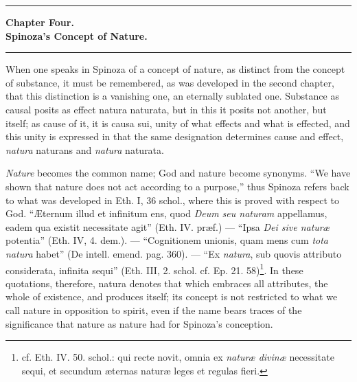 \documentclass[12pt,a4paper,openany]{book}
\newcommand{\opage}[1]{\marginnote{\footnotesize\textit{[#1]}}}
\begin{document}
\bigskip
\begin{center}\rule{2.5cm}{0.4pt}\end{center}
\bigskip

\begin{center}
{\large\textbf{Chapter Four.}}\\[4pt]
\textbf{Spinoza's Concept of Nature.}\\[6pt]
\rule{2cm}{0.4pt}
\end{center}
\bigskip

When one speaks in Spinoza of a concept of nature, as distinct from
the concept of substance, it must be remembered, as was developed in the second chapter,
that this distinction is a vanishing one, an eternally
sublated one. Substance as causal posits as effect natura
naturata, but in this it posits not another, but itself; as
cause of it, it is causa sui, unity of what effects and what is
effected, and this unity is expressed in that the same designation
determines cause and effect, \emph{natura} naturans and \emph{natura} naturata.

\opage{72}\setcounter{footnote}{0}\emph{Nature} becomes the common name; God and nature become synonyms.
``We have shown that nature does not act according to a purpose,''
thus Spinoza refers back to what was developed in Eth. I, 36 schol.,
where this is proved with respect to God. ``Æternum
illud et infinitum ens, quod \emph{Deum seu naturam} appellamus, eadem
qua existit necessitate agit'' (Eth. IV. præf.) --- ``Ipsa \emph{Dei sive
naturæ} potentia'' (Eth. IV, 4. dem.). --- ``Cognitionem unionis,
quam mens cum \emph{tota natura} habet'' (De intell. emend. pag. 360).
--- ``Ex \emph{natura}, sub quovis attributo considerata, infinita
sequi'' (Eth. III, 2. schol. cf. Ep. 21. 58)\footnote{cf. Eth.
IV. 50. schol.: qui recte novit, omnia ex \emph{naturæ divinæ}
necessitate sequi, et secundum æternas naturæ leges et regulas
fieri.}. In these quotations, therefore, natura denotes that which embraces all
attributes, the whole of existence, and produces itself;
its concept is not restricted to what we call nature in
opposition to spirit, even if the name bears traces of the
significance that nature as nature had for Spinoza's conception.
\end{document}
